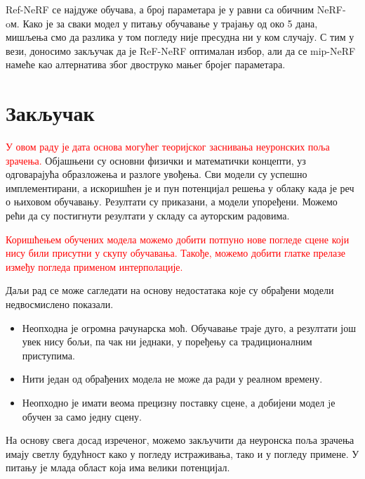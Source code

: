 \documentclass[12pt, a4paper, twoside]{book}
\numberwithin{equation}{chapter}
\numberwithin{theorem}{section}
\numberwithin{definition}{section}
\numberwithin{definitionChapter}{chapter}
\begin{document}
Ref-NeRF се најдуже обучава, а број параметара је у равни са обичним NeRF-oм. Како је за сваки модел у питању обучавање у трајању од 
око 5 дана, мишљења смо да разлика у том погледу није пресудна ни у ком случају. С тим у вези, доносимо закључак да је ReF-NeRF оптималан
избор, али да се mip-NeRF намеће као алтернатива због двоструко мањег бројег параметара.
 
\chapter{Закључак}
\textcolor{red}{У овом раду је дата основа могућег теоријског заснивања неуронских поља зрачења.} Објашњени су основни физички и математички
концепти, уз одговарајућа образложења и разлоге увођења. Сви модели су успешно имплементирани, а искоришћен је и
пун потенцијал решења у облаку када је реч о њиховом обучавању. Резултати су приказани, а модели упоређени.
Можемо рећи да су постигнути резултати у складу са ауторским радовима.

\textcolor{red}{Коришћењем обучених модела можемо добити потпуно нове погледе сцене који нису били присутни у скупу обучавања.
Такође, можемо добити глатке прелазе између погледа применом интерполације.}

Даљи рад се може сагледати на основу недостатака које су обрађени модели недвосмислено показали.
\begin{itemize}
	\item Неопходна је огромна рачунарска моћ. Обучавање траје дуго, а резултати још увек нису
	бољи, па чак ни једнаки, у поређењу са традиционалним приступима.
	\item Нити један од обрађених модела не може да ради у реалном времену.
	\item Неопходно је имати веома прецизну поставку сцене, а добијени модел jе обучен за само једну сцену.
\end{itemize}

На основу свега досад изреченог, можемо закључити да неуронска поља зрачења имају светлу будућност како у погледу
истраживања, тако и у погледу примене. У питању је млада област која има велики потенцијал.



\end{document}
